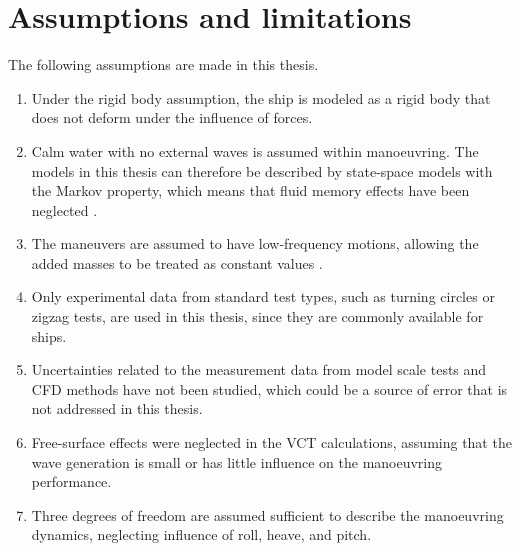 \section{Assumptions and limitations}
The following assumptions are made in this thesis.
\begin{enumerate}[label=(\Roman*),itemsep=1mm]
    \item Under the rigid body assumption, the ship is modeled as a rigid body that does not deform under the influence of forces.

    \item Calm water with no external waves is assumed within manoeuvring. The models in this thesis can therefore be described by state-space models with the Markov property, which means that fluid memory effects have been neglected \cite{fossenHandbookMarineCraft2011}. 

    \item The maneuvers are assumed to have low-frequency motions, allowing the added masses to be treated as constant values \cite{fossenHandbookMarineCraft2011}.

    \item Only experimental data from standard test types, such as turning circles or zigzag tests, are used in this thesis, since they are commonly available for ships. 

    \item Uncertainties related to the measurement data from model scale tests and CFD methods have not been studied, which could be a source of error that is not addressed in this thesis.
    
    \item Free-surface effects were neglected in the VCT calculations, assuming that the wave generation is small or has little influence on the manoeuvring performance.
    
    \item Three degrees of freedom are assumed sufficient to describe the manoeuvring dynamics, neglecting influence of roll, heave, and pitch. 
        
\end{enumerate}




